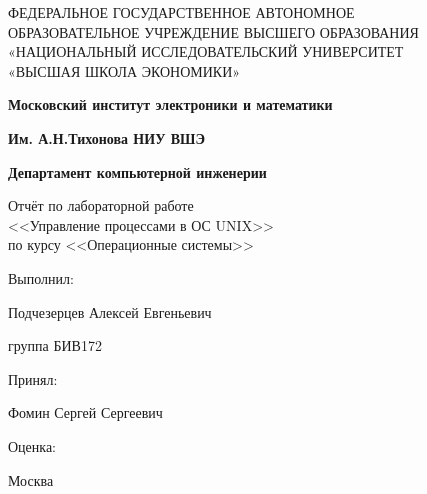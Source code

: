 \begin{titlepage}
	\begin{center}
		ФЕДЕРАЛЬНОЕ  ГОСУДАРСТВЕННОЕ АВТОНОМНОЕ \\
		ОБРАЗОВАТЕЛЬНОЕ УЧРЕЖДЕНИЕ ВЫСШЕГО ОБРАЗОВАНИЯ\\
		«НАЦИОНАЛЬНЫЙ ИССЛЕДОВАТЕЛЬСКИЙ УНИВЕРСИТЕТ\\
		«ВЫСШАЯ ШКОЛА ЭКОНОМИКИ»
	\end{center}
	
	\begin{center}
		\textbf{Московский институт электроники и математики}
		
		\textbf{Им. А.Н.Тихонова НИУ ВШЭ}
		
		\textbf{Департамент компьютерной инженерии}
	\end{center}	
	\vspace{6ex}
	\begin{center}
	Отчёт по лабораторной работе \\
	<<Управление процессами в ОС UNIX>> \\ 
	 по курсу <<Операционные системы>>
	\end{center}	
	\vspace{5ex}
	
	Выполнил:
	
	Подчезерцев Алексей Евгеньевич 
	
	группа БИВ172
	
	\vspace{5ex}
	
	Принял:
	
	Фомин Сергей Сергеевич 
	
	\vspace{5ex}
	
	Оценка:


	\vfill
	\begin{center}
		Москва \the\year
	\end{center}
\end{titlepage}